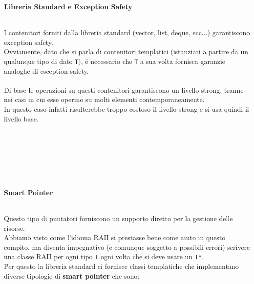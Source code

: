 \documentclass{article}
\begin{document}
\begin{large}\textbf{\textcolor{blu}{Libreria Standard e Exception Safety}} \\ \\ \end{large}
I contenitori forniti dalla libreria standard (vector, list, deque, ecc...) garantiscono exception safety.\\ Ovviamente, dato che si parla di contenitori templatici (istanziati a partire da un qualunque tipo di dato \texttt{T}), \'e necessario che \texttt{T} a sua volta fornisca garanzie analoghe di esception safety. \\ \\
Di base le operazioni su questi contenitori garantiscono un livello strong, tranne nei casi in cui esse operino su molti elementi contemporaneamente. \\In questo caso infatti risulterebbe troppo costoso il livello strong e si usa quindi il livello base.
\\ \\ \\ \\ \\ \\ \\
\begin{large} \textbf{\textcolor{blu}{Smart Pointer}} \\ \\ \end{large}
Questo tipo di puntatori forniscono un supporto diretto per la gestione delle risorse. \\Abbiamo visto come l'idioma RAII si prestasse bene come aiuto in questo compito, ma diventa impegnativo (e comunque soggetto a possibili errori) scrivere una classe RAII per ogni tipo \texttt{T} ogni volta che si deve usare un \texttt{T*}. 
\\Per questo la libreria standard ci fornisce classi templatiche che implementano diverse tipologie di \textbf{smart pointer} che sono: \\
\end{document}
